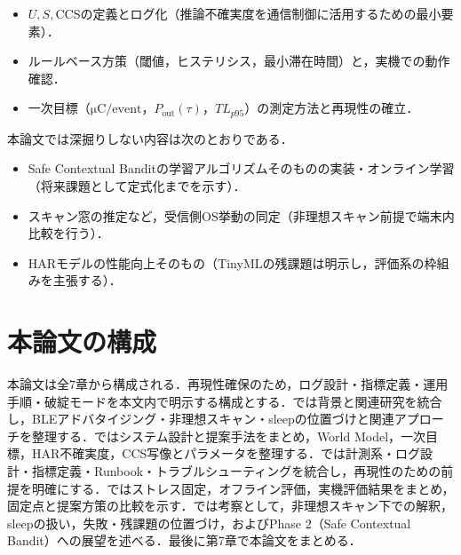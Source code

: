 \begin{itemize}
  \item $U,S,\mathrm{CCS}$の定義とログ化（推論不確実度を通信制御に活用するための最小要素）．
  \item ルールベース方策（閾値，ヒステリシス，最小滞在時間）と，実機での動作確認．
  \item 一次目標（$\si{\micro\coulomb}/\text{event}$，$P_{\mathrm{out}}(\tau)$，$TL_{p95}$）の測定方法と再現性の確立．
\end{itemize}

本論文では深掘りしない内容は次のとおりである．
\begin{itemize}
  \item Safe Contextual Banditの学習アルゴリズムそのものの実装・オンライン学習（将来課題として定式化までを示す）．
  \item スキャン窓の推定など，受信側OS挙動の同定（非理想スキャン前提で端末内比較を行う）．
  \item HARモデルの性能向上そのもの（TinyMLの残課題は明示し，評価系の枠組みを主張する）．
\end{itemize}

\section{本論文の構成}
本論文は全7章から構成される．再現性確保のため，ログ設計・指標定義・運用手順・破綻モードを本文内で明示する構成とする．では背景と関連研究を統合し，BLEアドバタイジング・非理想スキャン・sleepの位置づけと関連アプローチを整理する．ではシステム設計と提案手法をまとめ，World Model，一次目標，HAR不確実度，CCS写像とパラメータを整理する．では計測系・ログ設計・指標定義・Runbook・トラブルシューティングを統合し，再現性のための前提を明確にする．ではストレス固定，オフライン評価，実機評価結果をまとめ，固定点と提案方策の比較を示す．では考察として，非理想スキャン下での解釈，sleepの扱い，失敗・残課題の位置づけ，およびPhase 2（Safe Contextual Bandit）への展望を述べる．最後に第7章で本論文をまとめる．

